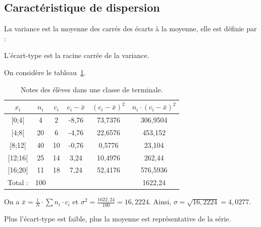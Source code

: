                   \subsection{Caract\'eristique de dispersion}
                        La variance est la moyenne des carr\'es des \'ecarts \`a la moyenne, elle est d\'efinie par : 
                        \begin{center}
                        \end{center}
                        L'\'ecart-type est la racine carr\'ee de la variance.
                        \begin{ex}
                              On consid\`ere le tableau~\ref{tab:variance}.
                              \begin{table}[H]
                                    \centering
                                    \begin{tabular}{|c|c|c|c|c|c|}
                                    \hline 
                                    $x_i$ & $n_i$ & $c_i$ & $c_i - \bar{x}$ & $(c_i - \bar{x})^2$ & $n_i \cdot (c_i - \bar{x})^2$ \\ 
                                    \hline 
                                    [0;4[ & 4 & 2 & -8,76 & 73,7376 & 306,9504 \\ 
                                    \hline 
                                    [4;8[ & 20 & 6 & -4,76 & 22,6576 & 453,152 \\ 
                                    \hline 
                                    [8;12[ & 40 & 10 & -0,76 & 0,5776 & 23,104 \\ 
                                    \hline 
                                    [12;16[ & 25 & 14 & 3,24 & 10,4976 & 262,44 \\ 
                                    \hline 
                                    [16;20[ & 11 & 18 & 7,24 & 52,4176 & 576,5936 \\ 
                                    \hline 
                                    Total : & 100 &   &   &   & 1622,24 \\ 
                                    \hline 
                                    \end{tabular} 
                                    \caption{Notes des \'el\`eves dans une classe de terminale.}
                                    \label{tab:variance}
                              \end{table}
                              On a $\bar{x} = \frac{1}{N} \cdot \sum n_i \cdot c_i$ et 
                              $\sigma^2 = \frac{1622,24}{100} = 16,2224$.
                              Ainsi, $\sigma = \sqrt{16,2224} = 4,0277$.
                        \end{ex}
                        Plus l'\'ecart-type est faible, plus la moyenne est repr\'esentative de la s\'erie.
%
